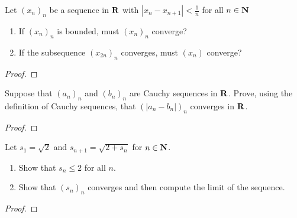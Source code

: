 \documentclass[11pt,twoside,openany]{memoir}
\begin{document}
\newpage 
\fancyhead[L]{\scalebox{0.9}{Sequences}}
\fancyhead[R]{\scalebox{0.9}{Appeared on: F14}}
\begin{problem}
    Let $(x_n)_n$ be a sequence in $\mathbf{R}$ with $|x_n - x_{n+1}| < \frac{1}{n}$ for all $n \in \mathbf{N}$
    \phantom{a}
    \begin{enumerate}[label = (\arabic*)]
        \item If $(x_n)_n$ is bounded, must $(x_n)_n$ converge?
        \item If the subsequence $(x_{2n})_n$ converges, must $(x_n)$ converge?
    \end{enumerate}
\end{problem}
\begin{proof}
\end{proof}

\newpage
\fancyhead[L]{\scalebox{0.9}{Sequences}}
\fancyhead[R]{\scalebox{0.9}{Appeared on: W21}}
\begin{problem}
    Suppose that $(a_n)_n$ and $(b_n)_n$ are Cauchy sequences in $\mathbf{R}$. Prove, using the definition of Cauchy sequences, that $\left( \left| a_n - b_n \right| \right)_n$ converges in $\mathbf{R}$.
\end{problem}
\begin{proof}
\end{proof}

\newpage
\fancyhead[L]{\scalebox{0.9}{Sequences}}
\fancyhead[R]{\scalebox{0.9}{Appeared on: F20}}
\begin{problem}
    Let $s_1 = \sqrt{2}$ and $s_{n+1} = \sqrt{2 + s_n}$ for $n \in \mathbf{N}$.
        \phantom{a}
        \begin{enumerate}[label = (\arabic*)]
            \item Show that $s_n \leq 2$ for all $n$.
            \item Show that $(s_n)_n$ converges and then compute the limit of the sequence.
        \end{enumerate}
\end{problem}
\begin{proof}
\end{proof}
\end{document}
